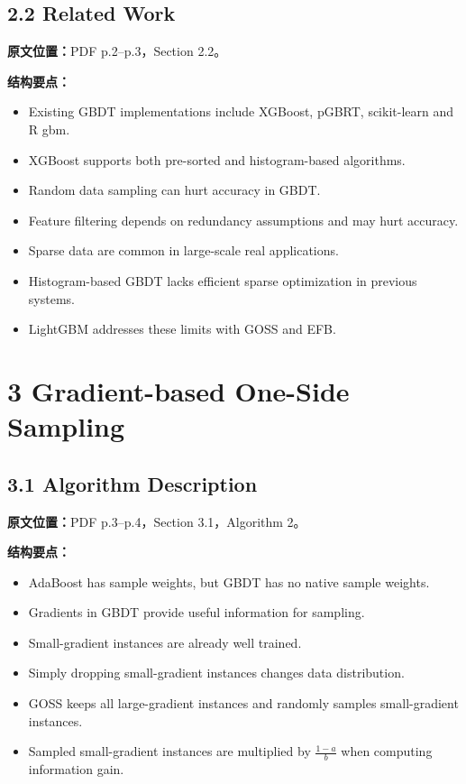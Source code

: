 \subsection{2.2 Related Work}

\textbf{原文位置：}PDF p.2--p.3，Section 2.2。

\textbf{结构要点：}
\begin{itemize}
  \item Existing GBDT implementations include XGBoost, pGBRT, scikit-learn and R gbm.
  \item XGBoost supports both pre-sorted and histogram-based algorithms.
  \item Random data sampling can hurt accuracy in GBDT.
  \item Feature filtering depends on redundancy assumptions and may hurt accuracy.
  \item Sparse data are common in large-scale real applications.
  \item Histogram-based GBDT lacks efficient sparse optimization in previous systems.
  \item LightGBM addresses these limits with GOSS and EFB.
\end{itemize}

\section{3 Gradient-based One-Side Sampling}

\subsection{3.1 Algorithm Description}

\textbf{原文位置：}PDF p.3--p.4，Section 3.1，Algorithm 2。

\textbf{结构要点：}
\begin{itemize}
  \item AdaBoost has sample weights, but GBDT has no native sample weights.
  \item Gradients in GBDT provide useful information for sampling.
  \item Small-gradient instances are already well trained.
  \item Simply dropping small-gradient instances changes data distribution.
  \item GOSS keeps all large-gradient instances and randomly samples small-gradient instances.
  \item Sampled small-gradient instances are multiplied by $\frac{1-a}{b}$ when computing information gain.
\end{itemize}

